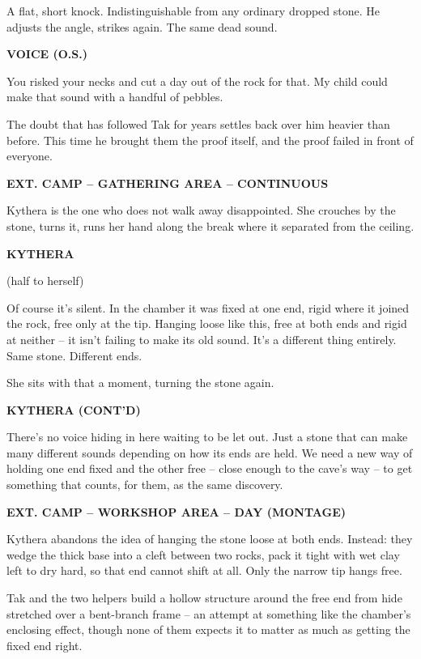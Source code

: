 \documentclass[12pt]{article}
\newcommand{\sceneheading}[1]{%
  \bigskip\noindent\textbf{#1}\par\smallskip
}
\newcommand{\action}[1]{%
  \noindent #1\par\medskip
}
\newcommand{\charcue}[1]{%
  \par\hspace*{2.2in}\textbf{#1}\par
}
\newenvironment{dialogue}{%
  \begin{list}{}{\leftmargin=1.5in\rightmargin=2in\itemsep=0pt\parsep=0pt\topsep=0pt}
  \item[]
}{%
  \end{list}\medskip
}
\newcommand{\parenthetical}[1]{%
  \hspace*{1.9in}(#1)\par
}
\begin{document}
\action{A flat, short knock. Indistinguishable from any ordinary dropped stone. He adjusts the angle, strikes again. The same dead sound.}

\charcue{VOICE (O.S.)}
\begin{dialogue}
You risked your necks and cut a day out of the rock for that. My child could make that sound with a handful of pebbles.
\end{dialogue}

\action{The doubt that has followed Tak for years settles back over him heavier than before. This time he brought them the proof itself, and the proof failed in front of everyone.}

\sceneheading{EXT. CAMP -- GATHERING AREA -- CONTINUOUS}

\action{Kythera is the one who does not walk away disappointed. She crouches by the stone, turns it, runs her hand along the break where it separated from the ceiling.}

\charcue{KYTHERA}
\begin{dialogue}
\parenthetical{half to herself}
Of course it's silent. In the chamber it was fixed at one end, rigid where it joined the rock, free only at the tip. Hanging loose like this, free at both ends and rigid at neither -- it isn't failing to make its old sound. It's a different thing entirely. Same stone. Different ends.
\end{dialogue}

\action{She sits with that a moment, turning the stone again.}

\charcue{KYTHERA (CONT'D)}
\begin{dialogue}
There's no voice hiding in here waiting to be let out. Just a stone that can make many different sounds depending on how its ends are held. We need a new way of holding one end fixed and the other free -- close enough to the cave's way -- to get something that counts, for them, as the same discovery.
\end{dialogue}

\sceneheading{EXT. CAMP -- WORKSHOP AREA -- DAY (MONTAGE)}

\action{Kythera abandons the idea of hanging the stone loose at both ends. Instead: they wedge the thick base into a cleft between two rocks, pack it tight with wet clay left to dry hard, so that end cannot shift at all. Only the narrow tip hangs free.}

\action{Tak and the two helpers build a hollow structure around the free end from hide stretched over a bent-branch frame -- an attempt at something like the chamber's enclosing effect, though none of them expects it to matter as much as getting the fixed end right.}
\end{document}
